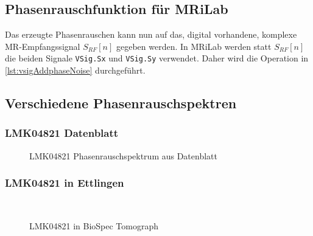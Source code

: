 \subsection{Phasenrauschfunktion für MRiLab}
Das erzeugte Phasenrauschen kann nun auf das, digital vorhandene, komplexe MR-Empfangssignal $S_{RF}[n]$ gegeben werden. In MRiLab werden statt $S_{RF}[n]$ die beiden Signale \texttt{VSig.Sx} und \texttt{VSig.Sy} verwendet. Daher wird die Operation in \autoref{lst:vsigAddphaseNoise} durchgeführt.
	


\subsection{Verschiedene Phasenrauschspektren}

\subsubsection{LMK04821 Datenblatt}

\begin{figure}[H]
	\centering
	\caption[LMK08421 Phasenrauschspektrum]{LMK04821 Phasenrauschspektrum aus Datenblatt}
	\label{fig:lmkDatasheetPhaseNoise}
\end{figure}

\subsubsection{LMK04821 in Ettlingen}

\begin{figure}[H]
	\centering
	\\[4ex]
	\caption{LMK04821 in BioSpec Tomograph}
	\label{lmkEttlingenBioSpec}
\end{figure}



